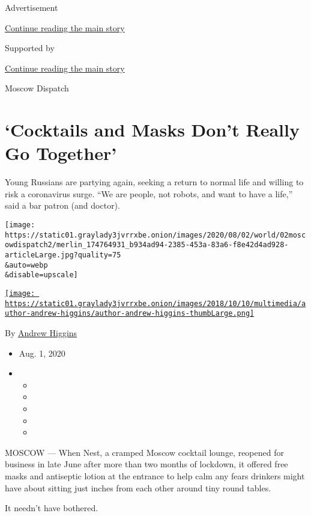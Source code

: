 Advertisement

\protect\hyperlink{after-top}{Continue reading the main story}

Supported by

\protect\hyperlink{after-sponsor}{Continue reading the main story}

Moscow Dispatch

\hypertarget{cocktails-and-masks-dont-really-go-together}{%
\section{`Cocktails and Masks Don't Really Go
Together'}\label{cocktails-and-masks-dont-really-go-together}}

Young Russians are partying again, seeking a return to normal life and
willing to risk a coronavirus surge. ``We are people, not robots, and
want to have a life,'' said a bar patron (and doctor).

\texttt{[image: https://static01.graylady3jvrrxbe.onion/images/2020/08/02/world/02moscowdispatch2/merlin\_174764931\_b934ad94-2385-453a-83a6-f8e42d4ad928-articleLarge.jpg?quality=75\\\&auto=webp\\\&disable=upscale]}

\href{https://www.nytimes3xbfgragh.onion/by/andrew-higgins}{\texttt{[image: https://static01.graylady3jvrrxbe.onion/images/2018/10/10/multimedia/author-andrew-higgins/author-andrew-higgins-thumbLarge.png]}}

By \href{https://www.nytimes3xbfgragh.onion/by/andrew-higgins}{Andrew
Higgins}

\begin{itemize}
\item
  Aug. 1, 2020
\item
  \begin{itemize}
  \item
  \item
  \item
  \item
  \item
  \end{itemize}
\end{itemize}

MOSCOW --- When Nest, a cramped Moscow cocktail lounge, reopened for
business in late June after more than two months of lockdown, it offered
free masks and antiseptic lotion at the entrance to help calm any fears
drinkers might have about sitting just inches from each other around
tiny round tables.

It needn't have bothered.

